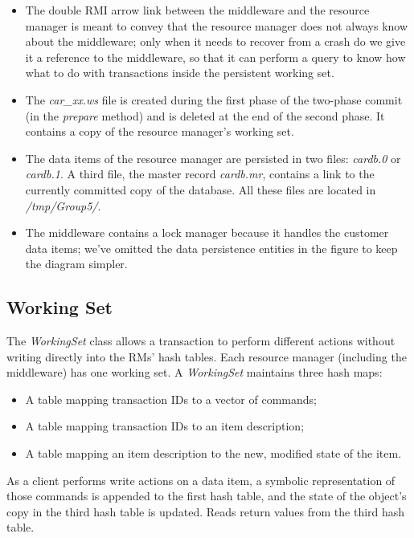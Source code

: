 \documentclass[11pt]{article}
\begin{document}
\begin{itemize}
  \item The double RMI arrow link between the middleware and the
    resource manager is meant to convey that the resource manager does
    not always know about the middleware; only when it needs to
    recover from a crash do we give it a reference to the middleware,
    so that it can perform a query to know how what to do with
    transactions inside the persistent working set.
  \item The {\it car\_xx.ws} file is created during the first phase of
    the two-phase commit (in the {\it prepare} method) and is deleted
    at the end of the second phase.  It contains a copy of the
    resource manager's working set.
  \item The data items of the resource manager are persisted in two
    files: {\it cardb.0} or {\it cardb.1}.  A third file, the master
    record {\it cardb.mr}, contains a link to the currently committed
    copy of the database.  All these files are located in {\it
      /tmp/Group5/}.
  \item The middleware contains a lock manager because it handles the
    customer data items; we've omitted the data persistence entities
    in the figure to keep the diagram simpler.
\end{itemize}


\subsection{Working Set}

The {\it WorkingSet} class allows a transaction to perform different
actions without writing directly into the RMs' hash tables.  Each
resource manager (including the middleware) has one working set.  A
{\it WorkingSet} maintains three hash maps:

\begin{itemize}
  \item A table mapping transaction IDs to a vector of commands;
  \item A table mapping transaction IDs to an item description;
  \item A table mapping an item description to the new, modified state
    of the item.
\end{itemize}

As a client performs write actions on a data item, a symbolic
representation of those commands is appended to the first hash table,
and the state of the object's copy in the third hash table is updated.
Reads return values from the third hash table.
\end{document}
